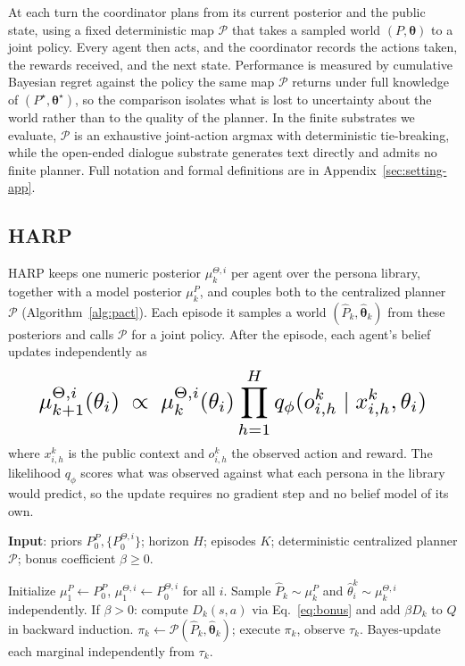\documentclass[letterpaper]{article} %
\begin{document}
At each turn the coordinator plans from its current posterior and the public state, using a fixed deterministic map $\mathcal P$ that takes a sampled world $(P,\boldsymbol\theta)$ to a joint policy. Every agent then acts, and the coordinator records the actions taken, the rewards received, and the next state. Performance is measured by cumulative Bayesian regret against the policy the same map $\mathcal P$ returns under full knowledge of $(P^\star,\boldsymbol\theta^\star)$, so the comparison isolates what is lost to uncertainty about the world rather than to the quality of the planner. In the finite substrates we evaluate, $\mathcal P$ is an exhaustive joint-action argmax with deterministic tie-breaking, while the open-ended dialogue substrate generates text directly and admits no finite planner. Full notation and formal definitions are in Appendix~\ref{sec:setting-app}.

\subsection{HARP}
\label{sec:pact-vanilla}

HARP keeps one numeric posterior $\mu_k^{\Theta,i}$ per agent over the persona library, together with a model posterior $\mu_k^P$, and couples both to the centralized planner $\mathcal P$ (Algorithm~\ref{alg:pact}). Each episode it samples a world $(\hat P_k, \hat{\boldsymbol\theta}_k)$ from these posteriors and calls $\mathcal P$ for a joint policy. After the episode, each agent's belief updates independently as
\begin{equation}
\label{eq:likelihood}
\resizebox{0.90\linewidth}{!}{$\displaystyle
\mu_{k+1}^{\Theta,i}(\theta_i) \;\propto\; \mu_k^{\Theta,i}(\theta_i)\prod_{h=1}^{H} q_\phi(o_{i,h}^k\mid x_{i,h}^k,\theta_i)
$}
\end{equation}
where $x_{i,h}^k$ is the public context and $o_{i,h}^k$ the observed action and reward. The likelihood $q_\phi$ scores what was observed against what each persona in the library would predict, so the update requires no gradient step and no belief model of its own.

\begin{algorithm}[t]
\caption{HARP (and HARP\textsuperscript{+} with $\beta>0$)}\label{alg:pact}
\textbf{Input}: priors $P_0^P, \{P_0^{\Theta,i}\}$; horizon $H$; episodes $K$; deterministic centralized planner $\mathcal P$; bonus coefficient $\beta\geq 0$.\\
\begin{algorithmic}[1]
\STATE Initialize $\mu_1^P\!\gets\! P_0^P$, $\mu_1^{\Theta,i}\!\gets\! P_0^{\Theta,i}$ for all $i$.
  \STATE Sample $\hat P_k\!\sim\!\mu_k^P$ and $\hat\theta_i^k\!\sim\!\mu_k^{\Theta,i}$ independently.
  \STATE If $\beta>0$: compute $D_k(s,a)$ via Eq.~\eqref{eq:bonus} and add $\beta D_k$ to $Q$ in backward induction.
  \STATE $\pi_k\gets\mathcal P(\hat P_k,\hat{\boldsymbol\theta}_k)$; execute $\pi_k$, observe $\tau_k$.
  \STATE Bayes-update each marginal independently from $\tau_k$.
\ENDFOR
\end{algorithmic}
\end{algorithm}
\end{document}
